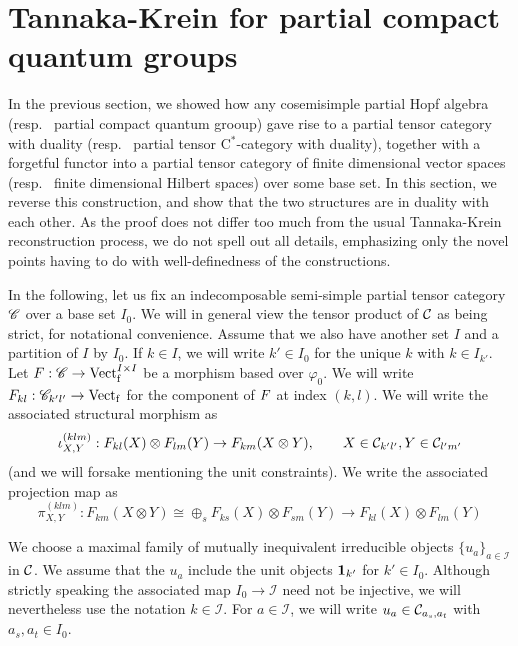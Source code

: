 \section{Tannaka-Krein for partial compact quantum groups}


In the previous section, we showed how any cosemisimple partial Hopf algebra (resp.~ partial compact quantum grooup) gave rise to a partial tensor category with duality (resp.~ partial tensor C$^*$-category with duality), together with a forgetful functor into a partial tensor category of finite dimensional vector spaces (resp.~ finite dimensional Hilbert spaces) over some base set. In this section, we reverse this construction, and show that the two structures are in duality with each other. As the proof does not differ too much from the usual Tannaka-Krein reconstruction process, we do not spell out all details, emphasizing only the novel points having to do with well-definedness of the constructions. 

In the following, let us fix an indecomposable semi-simple partial tensor category $\mathscr{C}$ over a base set $I_0$. We will in general view the tensor product of $\mathcal{C}$ as being strict, for notational convenience. Assume that we also have another set $I$ and a partition of $I$ by $I_0$. If $k\in I$, we will write $k'\in I_0$ for the unique $k$ with $k\in I_{k'}$. Let $F: \mathscr{C}\rightarrow \mathrm{Vect}_{\operatorname{\mathrm{f}}}^{I\times I}$ be a morphism based over $\varphi_0$.  We will write $F_{kl}:\mathscr{C}_{k'l'}\rightarrow \mathrm{Vect}_{\operatorname{\mathrm{f}}}$ for the component of $F$ at index $(k,l)$. We will write the associated structural morphism as \[\iota^{(klm)}_{X,Y}: F_{kl}(X)\otimes F_{lm}(Y)\rightarrow F_{km}(X\otimes Y),\qquad X\in \mathcal{C}_{k'l'},Y\in \mathcal{C}_{l'm'}\] (and we will forsake mentioning the unit constraints). %
We write the associated projection map as \[\pi^{(klm)}_{X,Y}:F_{km}(X\otimes Y)\cong \oplus_{s} F_{ks}(X)\otimes F_{sm}(Y) \rightarrow F_{kl}(X)\otimes F_{lm}(Y)\]

We choose a maximal family of mutually inequivalent irreducible objects $\{u_a\}_{a\in \mathcal{I}}$ in $\mathcal{C}$. We assume that the $u_a$ include the unit objects $\mathbf{1}_{k'}$ for $k'\in I_0$. Although strictly speaking the associated map $I_0\rightarrow \mathcal{I}$ need not be injective, we will nevertheless use the notation $k\in \mathcal{I}$. %
For $a\in \mathcal{I}$, we will write $u_a \in \mathcal{C}_{a_s,a_t}$ with $a_s,a_t\in I_0$.

